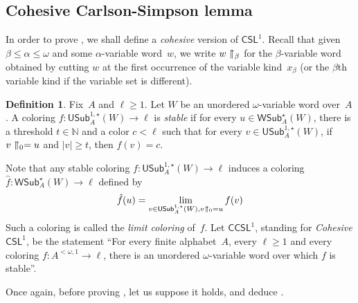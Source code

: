 \documentclass{article}
\newcommand{\RCA}[0]{\mathsf{RCA}}
\newcommand{\RT}[0]{\mathsf{RT}}
\newcommand{\CCSL}[0]{\mathsf{CCSL}}
\newcommand{\CSL}[0]{\mathsf{CSL}}
\newcommand{\NN}[0]{\mathbb{N}}
\newcommand{\USub}{\mathsf{USub}}
\newcommand{\WSub}{\mathsf{WSub}}
\def\qt#1{``#1''}%
\newtheorem{theorem}{Theorem}
\numberwithin{theorem}{section}
\newtheorem{corollary}[theorem]{Corollary}
\theoremstyle{definition}
\newtheorem{definition}[theorem]{Definition}
\newcommand{\upupharpoonright}{%
  \upharpoonright
  \mathrel{\mkern-4.5mu}%
  \upharpoonright
}
\newcommand{\uuh}{\upupharpoonright}
\begin{document}
\subsection{Cohesive Carlson-Simpson lemma}

In order to prove , we shall define a \emph{cohesive} version of $\CSL^1$.
Recall that given $\beta \leq \alpha \leq \omega$ and some $\alpha$-variable word~$w$, we write $w \uuh_\beta$ for the $\beta$-variable word obtained by cutting $w$ at the first occurrence of the variable kind~$x_\beta$ (or the $\beta$th variable kind if the variable set is different).


\begin{definition}
Fix~$A$ and $\ell \geq 1$. Let $W$ be an unordered $\omega$-variable word over~$A$.
A coloring $f : \USub^{1,\star}_A(W) \to \ell$ is \emph{stable}
if for every $u \in \WSub^{\star}_A(W)$, there is a threshold $t \in \NN$ and a color $c < \ell$ such that for every $v \in \USub^{1,\star}_A(W)$, if $v \uuh_0 = u$ and $|v| \geq t$, then $f(v) = c$.
\end{definition}

Note that any stable coloring $f : \USub^{1,\star}_A(W) \to \ell$ induces a coloring $\hat f : \WSub^{\star}_A(W) \to \ell$ defined by
$$\hat f(u) = \lim_{v \in \USub^{1,\star}_A(W), v \uuh_0 = u} f(v)$$
Such a coloring is called the \emph{limit coloring} of~$f$.
Let $\CCSL^1$, standing for \emph{Cohesive $\CSL^1$}, be the statement \qt{For every finite alphabet~$A$, every $\ell \geq 1$ and every coloring $f : A^{<\omega, 1} \to \ell$, there is an unordered $\omega$-variable word over which $f$ is stable}.



Once again, before proving , let us suppose it holds, and deduce .
\end{document}
